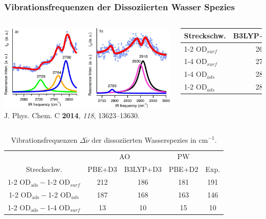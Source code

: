 \documentclass[hyperref={pdfpagelabels=false}]{beamer}
\begin{document}
\begin{frame}
 \frametitle{Vibrationsfrequenzen der Dissoziierten Wasser Spezies}
 \begin{columns}
  \centering
  \includegraphics[width=1.1\textwidth]{figures/0001_OD_vib_exp.jpeg}\\
  \footnotesize{J. Phys. Chem. C \textbf{2014}, \textit{118}, 13623--13630.}
  \begin{table}[!h]
  \centering
  \begin{tabular}{l|cc}
  \toprule
 Streckschw. &B3LYP+D3/AO & Exp.\\\midrule
 1-2 OD$_{surf}$&2697&2729\\
 1-4 OD$_{surf}$&2715&2764\\
 1-4 OD$_{ads}$&2873&2900\\
 1-2 OD$_{ads}$&2883&2910\\\bottomrule
  \end{tabular}
 \end{table}
 \end{columns}
 \vspace{-.5cm}
 \pause
  \begin{table}[!h]
  \centering
    \caption{Vibrationsfrequenzen $\Delta \tilde{\nu}$ der dissoziierten Wasserspezies in cm$^{-1}$.}
    \vspace{-0.5cm}
  \begin{tabular}{c|cc|c|c}
  \toprule
& \multicolumn{2}{c}{AO} & PW & \\
 Streckschw. &PBE+D3 & B3LYP+D3 & PBE+D2 & Exp.\\\midrule
 1-2 OD$_{\textrm{ads}}-$1-2 OD$_{surf}$& 212& 186& 181& 191 \\
 1-2 OD$_{\textrm{ads}}-$1-2 OD$_{ads}$ & 187& 168& 163& 146\\
 1-2 OD$_{\textrm{ads}}-$1-4 OD$_{surf}$& 13& 10& 15& 10\\\bottomrule
  \end{tabular}
 \end{table}
\end{frame} 
\end{document}
